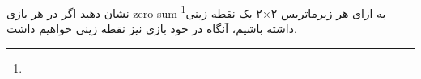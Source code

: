 نشان دهید اگر در هر بازی 
zero-sum
به ازای هر زیرماتریس ۲×۲ یک نقطه زینی\footnote{} داشته باشیم، آنگاه در خود بازی نیز نقطه زینی خواهیم داشت.